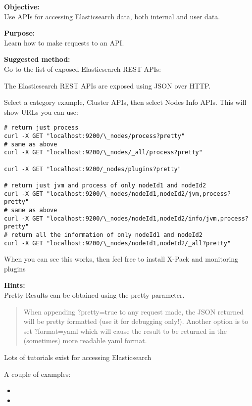 \documentclass[a4paper,11pt,notitlepage]{report}
\begin{document}

{\bf Objective:}\\
Use APIs for accessing Elasticsearch data, both internal and user data.

{\bf Purpose:}\\
Learn how to make requests to an API.

{\bf Suggested method:}\\
Go to the list of exposed Elasticsearch REST APIs:\\

The Elasticsearch REST APIs are exposed using JSON over HTTP.

Select a category example, Cluster APIs, then select Nodes Info APIs. This will show URLs you can use:

\begin{verbatim}
# return just process
curl -X GET "localhost:9200/\_nodes/process?pretty"
# same as above
curl -X GET "localhost:9200/\_nodes/_all/process?pretty"

curl -X GET "localhost:9200/_nodes/plugins?pretty"

# return just jvm and process of only nodeId1 and nodeId2
curl -X GET "localhost:9200/\_nodes/nodeId1,nodeId2/jvm,process?pretty"
# same as above
curl -X GET "localhost:9200/\_nodes/nodeId1,nodeId2/info/jvm,process?pretty"
# return all the information of only nodeId1 and nodeId2
curl -X GET "localhost:9200/\_nodes/nodeId1,nodeId2/_all?pretty"
\end{verbatim}

When you can see this works, then feel free to install X-Pack and monitoring plugins

{\bf Hints:}\\
Pretty Results can be obtained using the pretty parameter.
\begin{quote}
When appending ?pretty=true to any request made, the JSON returned will be pretty formatted (use it for debugging only!). Another option is to set ?format=yaml which will cause the result to be returned in the (sometimes) more readable yaml format.
\end{quote}

Lots of tutorials exist for accessing Elasticsearch

A couple of examples:
\begin{itemize}
\item {}
\item {}
\end{itemize}
\end{document}

